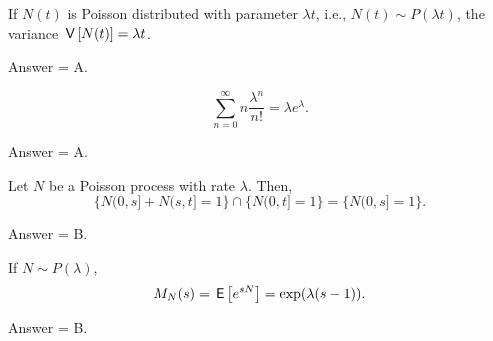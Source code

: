 \begin{exercise}[201802]
If $N(t)$ is Poisson distributed with parameter $\lambda t$, i.e., $N(t) \sim P(\lambda t)$, the variance $\,\mathsf{V}\left[N(t)\right] = \lambda t$. 
\begin{solution}
Answer = A.
\end{solution}
\end{exercise}

\begin{exercise}[201802]
\begin{equation*}
\sum_{n=0}^\infty n \frac{\lambda^n}{n!} = \lambda e^{\lambda}.
\end{equation*}
\begin{solution}
Answer = A.
\end{solution}
\end{exercise}

\begin{exercise}[201802]
Let $N$ be a Poisson process with rate $\lambda$. Then,
  \begin{equation*}
\{N(0,s]+N(s,t]=1\}\cap\{N(0,t]=1\} = \{N(0,s]=1\}.
  \end{equation*}
\begin{solution}
Answer = B.
\end{solution}
\end{exercise}

\begin{exercise}[201802]
If $N\sim P(\lambda)$, 
\begin{equation*}
M_{N}(s) = \,\mathsf{E}\left[e^{s N}\right] =\exp(\lambda(s - 1)).
\end{equation*}

\begin{solution}
Answer = B.
\end{solution}
\end{exercise}


